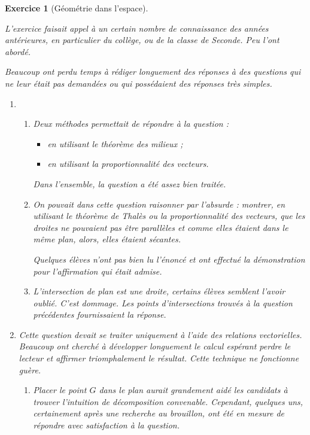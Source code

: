 \documentclass[12pt,a4paper]{article}
\theoremstyle{break}
\theoremstyle{nobreak}
\newtheorem{exercice}{Exercice}
\theoremstyle{nonumberplain}
\begin{document}
\begin{exercice}[Géométrie dans l'espace]~

  L'exercice faisait appel à un certain nombre de connaissance des
  années antérieures, en particulier du collège, ou de la classe de
  Seconde. Peu l'ont abordé.

  Beaucoup ont perdu temps à rédiger longuement des réponses à des
  questions qui ne leur était pas demandées ou qui possédaient des
  réponses très simples.

  \begin{enumerate}
    \item
      \begin{enumerate}
        \item Deux méthodes permettait de répondre à la question :
          \begin{itemize}
            \item en utilisant le théorème des milieux ;
            \item en utilisant la proportionnalité des vecteurs.
          \end{itemize}
          Dans l'ensemble, la question a été assez bien traitée.
        \item On pouvait dans cette question raisonner par l'absurde :
          montrer, en utilisant le théorème de Thalès ou la
          proportionnalité des vecteurs, que les droites ne pouvaient
          pas être parallèles et comme elles étaient dans le même plan,
          alors, elles étaient sécantes.

          Quelques élèves n'ont pas bien lu l'énoncé et ont effectué la
          démonstration pour l'affirmation qui était admise.
        \item L'intersection de plan est une droite, certains élèves
          semblent l'avoir oublié. C'est dommage. Les points
          d'intersections trouvés à la question précédentes
          fournissaient la réponse.
      \end{enumerate}
    \item Cette question devait se traiter uniquement à l'aide des
      relations vectorielles. Beaucoup ont cherché à développer
      longuement le calcul espérant perdre le lecteur et affirmer
      triomphalement le résultat. Cette technique ne fonctionne guère.
      \begin{enumerate}
        \item Placer le point $G$ dans le plan aurait grandement aidé
          les candidats à trouver l'intuition de décomposition
          convenable. Cependant, quelques uns, certainement après une
          recherche au brouillon, ont été en mesure de répondre avec
          satisfaction à la question.


\end{enumerate}
\end{enumerate}
\end{exercice}
\end{document}
